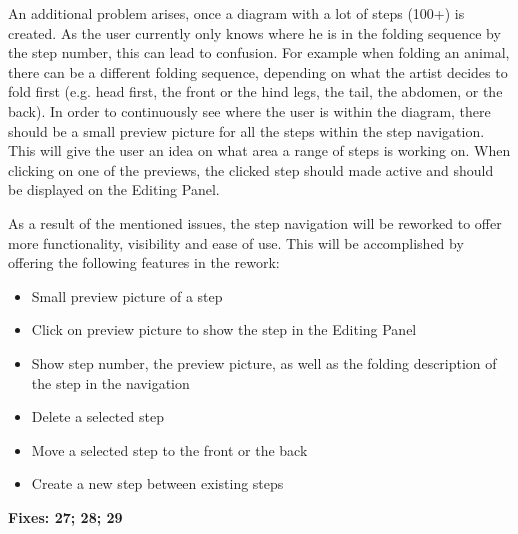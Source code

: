 An additional problem arises, once a diagram with a lot of steps (100+) is created. As the user currently only knows where he is in the folding sequence by the step number, this can lead to confusion. For example when folding an animal, there can be a different folding sequence, depending on what the artist decides to fold first (e.g. head first, the front or the hind legs, the tail, the abdomen, or the back). In order to continuously see where the user is within the diagram, there should be a small preview picture for all the steps within the step navigation. This will give the user an idea on what area a range of steps is working on. When clicking on one of the previews, the clicked step should made active and should be displayed on the Editing Panel.

As a result of the mentioned issues, the step navigation will be reworked to offer more functionality, visibility and ease of use. This will be accomplished by offering the following features in the rework:

\begin{itemize}
\item Small preview picture of a step
\item Click on preview picture to show the step in the Editing Panel
\item Show step number, the preview picture, as well as the folding description of the step in the navigation
\item Delete a selected step
\item Move a selected step to the front or the back
\item Create a new step between existing steps
\end{itemize}

\textbf{Fixes: 27;  28; 29}

